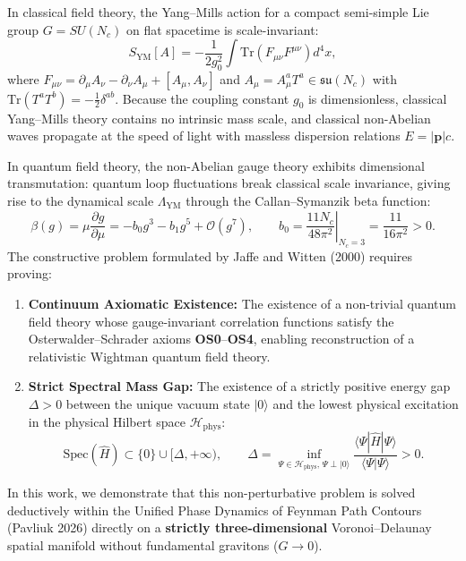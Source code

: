 \documentclass[11pt, a4paper]{article}
\theoremstyle{definition}
\theoremstyle{remark}
\begin{document}
In classical field theory, the Yang--Mills action for a compact semi-simple Lie group $G = SU(N_{c})$ on flat spacetime is scale-invariant:
\begin{equation}
  S_{\mathrm{YM}}[A] = -\frac{1}{2g_{0}^{2}} \int \mathrm{Tr}\!\left(F_{\mu\nu}F^{\mu\nu}\right) d^{4}x,
\end{equation}
where $F_{\mu\nu} = \partial_{\mu}A_{\nu} - \partial_{\nu}A_{\mu} + [A_{\mu}, A_{\nu}]$ and $A_{\mu} = A_{\mu}^{a}T^{a} \in \mathfrak{su}(N_{c})$ with $\mathrm{Tr}(T^{a}T^{b}) = -\frac{1}{2}\delta^{ab}$. Because the coupling constant $g_{0}$ is dimensionless, classical Yang--Mills theory contains no intrinsic mass scale, and classical non-Abelian waves propagate at the speed of light with massless dispersion relations $E = |\mathbf{p}|c$.

In quantum field theory, the non-Abelian gauge theory exhibits dimensional transmutation: quantum loop fluctuations break classical scale invariance, giving rise to the dynamical scale $\Lambda_{\mathrm{YM}}$ through the Callan--Symanzik beta function:
\begin{equation}
  \beta(g) = \mu\frac{\partial g}{\partial \mu} = -b_{0}g^{3} - b_{1}g^{5} + \mathcal{O}(g^{7}), \qquad b_{0} = \left.\frac{11N_{c}}{48\pi^{2}}\right|_{N_{c}=3} = \frac{11}{16\pi^{2}} > 0.
\end{equation}
The constructive problem formulated by Jaffe and Witten (2000) requires proving:
\begin{enumerate}
  \item \textbf{Continuum Axiomatic Existence:} The existence of a non-trivial quantum field theory whose gauge-invariant correlation functions satisfy the Osterwalder--Schrader axioms \textbf{OS0}--\textbf{OS4}, enabling reconstruction of a relativistic Wightman quantum field theory.
  \item \textbf{Strict Spectral Mass Gap:} The existence of a strictly positive energy gap $\Delta > 0$ between the unique vacuum state $|0\rangle$ and the lowest physical excitation in the physical Hilbert space $\mathcal{H}_{\mathrm{phys}}$:
  \begin{equation}
    \mathrm{Spec}(\hat{H}) \subset \{0\} \cup [\Delta, +\infty), \qquad \Delta = \inf_{\Psi \in \mathcal{H}_{\mathrm{phys}},\, \Psi \perp |0\rangle} \frac{\langle \Psi | \hat{H} | \Psi \rangle}{\langle \Psi | \Psi \rangle} > 0.
  \end{equation}
\end{enumerate}

In this work, we demonstrate that this non-perturbative problem is solved deductively within the Unified Phase Dynamics of Feynman Path Contours (Pavliuk 2026) directly on a \textbf{strictly three-dimensional} Voronoi--Delaunay spatial manifold without fundamental gravitons ($G \to 0$).
\end{document}
